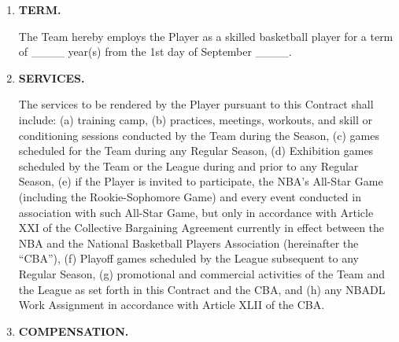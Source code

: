 \documentclass[
]{book}
\begin{document}
\begin{enumerate}
\def\labelenumi{\arabic{enumi}.}
\item
  \textbf{TERM.}

  The Team hereby employs the Player as a skilled basketball player for a term of \_\_\_\_ year(s) from the 1st day of September \_\_\_\_.
\item
  \textbf{SERVICES.}

  The services to be rendered by the Player pursuant to this Contract shall include: (a) training camp, (b) practices, meetings, workouts, and skill or conditioning sessions conducted by the Team during the Season, (c) games scheduled for the Team during any Regular Season, (d) Exhibition games scheduled by the Team or the League during and prior to any Regular Season, (e) if the Player is invited to participate, the NBA's All-Star Game (including the Rookie-Sophomore Game) and every event conducted in association with such All-Star Game, but only in accordance with Article XXI of the Collective Bargaining Agreement currently in effect between the NBA and the National Basketball Players Association (hereinafter the ``CBA''), (f) Playoff games scheduled by the League subsequent to any Regular Season, (g) promotional and commercial activities of the Team and the League as set forth in this Contract and the CBA, and (h) any NBADL Work Assignment in accordance with Article XLII of the CBA.
\item
  \textbf{COMPENSATION.}
\end{enumerate}
\end{document}
